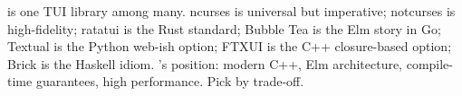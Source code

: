\begin{recap}
\maya{} is one TUI library among many. ncurses is universal but
imperative; notcurses is high-fidelity; ratatui is the Rust
standard; Bubble Tea is the Elm story in Go; Textual is the
Python web-ish option; FTXUI is the C++ closure-based option;
Brick is the Haskell idiom. \maya{}'s position: modern C++,
Elm architecture, compile-time guarantees, high performance.
Pick by trade-off.
\end{recap}
